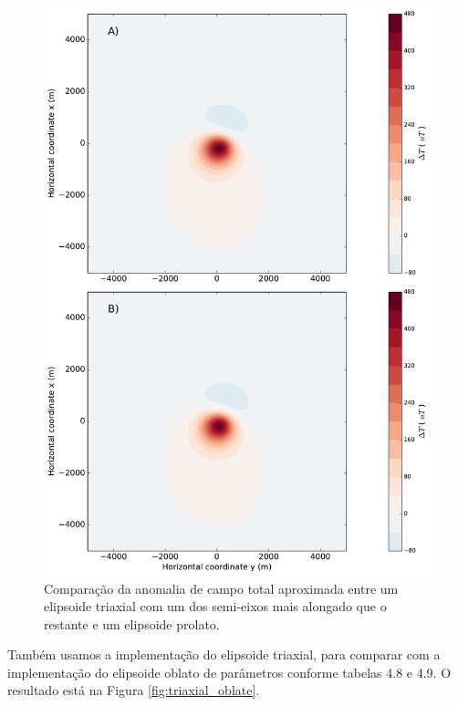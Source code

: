 \begin{figure}[hbt!]
	\centering \includegraphics[width=14.5 cm,height=22 cm]{figures/ellipsoid_triaxial_prolate}
	\caption[Comparação da anomalia de campo total aproximada entre um elipsoide triaxial com um dos semi-eixos mais alongado que o 
	restante e um elipsoide prolato.]{Comparação da anomalia de campo total aproximada entre um elipsoide triaxial com um dos semi-eixos mais alongado que o restante e um elipsoide prolato.}
	\label{fig:triaxial_prolate}
\end{figure}

Também usamos a implementação do elipsoide triaxial, para comparar com a implementação do elipsoide oblato de parâmetros conforme tabelas 4.8 e 4.9. O resultado está na Figura \ref{fig:triaxial_oblate}.

